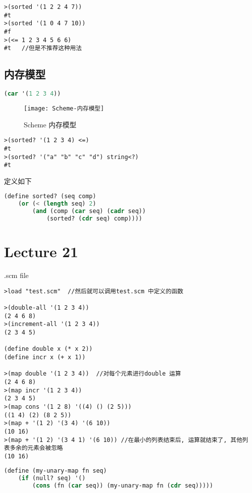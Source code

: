 \documentclass{article}
\begin{document}
\begin{verbatim}
>(sorted '(1 2 2 4 7))
#t
>(sorted '(1 0 4 7 10))
#f
>(<= 1 2 3 4 5 6 6)
#t   //但是不推荐这种用法
\end{verbatim}

\subsection{内存模型}
\begin{lstlisting}[language = Lisp]
(car '(1 2 3 4))
\end{lstlisting}
\begin{figure}[htbp]
	\centering
	\texttt{[image: Scheme-内存模型]}\\
	\caption{Scheme 内存模型}\label{fig.Scheme.内存模型}
\end{figure}


\begin{verbatim}
>(sorted? '(1 2 3 4) <=)
#t
>(sorted? '("a" "b" "c" "d") string<?)
#t
\end{verbatim}
定义如下
\begin{lstlisting}[language = Lisp]
(define sorted? (seq comp)
	(or (< (length seq) 2)
		(and (comp (car seq) (cadr seq))
			(sorted? (cdr seq) comp))))
\end{lstlisting}

\section{Lecture 21}
.scm file
\begin{verbatim}
>load "test.scm"  //然后就可以调用test.scm 中定义的函数

>(double-all '(1 2 3 4))
(2 4 6 8)
>(increment-all '(1 2 3 4))
(2 3 4 5)

(define double x (* x 2))
(define incr x (+ x 1))

>(map double '(1 2 3 4))  //对每个元素进行double 运算
(2 4 6 8)
>(map incr '(1 2 3 4))
(2 3 4 5)
>(map cons '(1 2 8) '((4) () (2 5)))
((1 4) (2) (8 2 5))
>(map + '(1 2) '(3 4) '(6 10))
(10 16)
>(map + '(1 2) '(3 4 1) '(6 10)) //在最小的列表结束后, 运算就结束了, 其他列表多余的元素会被忽略
(10 16)
\end{verbatim}

\begin{lstlisting}[language = Lisp]
(define (my-unary-map fn seq)
	(if (null? seq) '()
		(cons (fn (car seq)) (my-unary-map fn (cdr seq)))))
\end{lstlisting}
\end{document}
